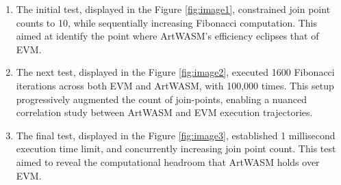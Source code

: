 \begin{enumerate}
  \item The initial test, displayed in the Figure \ref{fig:image1}, constrained join point counts to 10, while sequentially increasing Fibonacci computation. This aimed at identify the point where ArtWASM's efficiency eclipses that of EVM.
  \item The next test, displayed in the Figure \ref{fig:image2}, executed 1600 Fibonacci iterations across both EVM and ArtWASM, with 100,000 times. This setup progressively augmented the count of join-points, enabling a nuanced correlation study between ArtWASM and EVM execution trajectories.
  \item The final test, displayed in the Figure \ref{fig:image3}, established 1 millisecond execution time limit, and concurrently increasing join point count. This test aimed to reveal the computational headroom that ArtWASM holds over EVM.
\end{enumerate}

